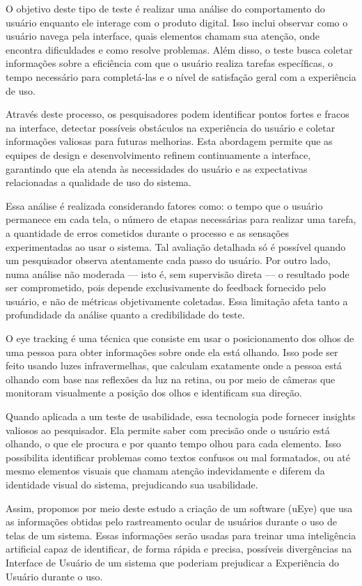 O objetivo deste tipo de teste é realizar uma análise do comportamento do usuário enquanto ele interage com o produto digital. Isso inclui observar como o usuário navega pela interface, quais elementos chamam sua atenção, onde encontra dificuldades e como resolve problemas. Além disso, o teste busca coletar informações sobre a eficiência com que o usuário realiza tarefas específicas, o tempo necessário para completá-las e o nível de satisfação geral com a experiência de uso.

Através deste processo, os pesquisadores podem identificar pontos fortes e fracos na interface, detectar possíveis obstáculos na experiência do usuário e coletar informações valiosas para futuras melhorias. Esta abordagem permite que as equipes de design e desenvolvimento refinem continuamente a interface, garantindo que ela atenda às necessidades do usuário e as expectativas relacionadas a qualidade de uso do sistema.

Essa análise é realizada considerando fatores como: o tempo que o usuário permanece em cada tela, o número de etapas necessárias para realizar uma tarefa, a quantidade de erros cometidos durante o processo e as sensações experimentadas ao usar o sistema. Tal avaliação detalhada só é possível quando um pesquisador observa atentamente cada passo do usuário. Por outro lado, numa análise não moderada — isto é, sem supervisão direta — o resultado pode ser comprometido, pois depende exclusivamente do feedback fornecido pelo usuário, e não de métricas objetivamente coletadas. Essa limitação afeta tanto a profundidade da análise quanto a credibilidade do teste.

\textcite{BELISIARIO2023, VIEIRA2019}


O eye tracking é uma técnica que consiste em usar o posicionamento dos olhos de uma pessoa para obter informações sobre onde ela está olhando. Isso pode ser feito usando luzes infravermelhas, que calculam exatamente onde a pessoa está olhando com base nas reflexões da luz na retina, ou por meio de câmeras que monitoram visualmente a posição dos olhos e identificam sua direção.

Quando aplicada a um teste de usabilidade, essa tecnologia pode fornecer insights valiosos ao pesquisador. Ela permite saber com precisão onde o usuário está olhando, o que ele procura e por quanto tempo olhou para cada elemento. Isso possibilita identificar problemas como textos confusos ou mal formatados, ou até mesmo elementos visuais que chamam atenção indevidamente e diferem da identidade visual do sistema, prejudicando sua usabilidade.

Assim, propomos por meio deste estudo a criação de um software (uEye) que usa as informações obtidas pelo rastreamento ocular de usuários durante o uso de telas de um sistema. Essas informações serão usadas para treinar uma inteligência artificial capaz de identificar, de forma rápida e precisa, possíveis divergências na Interface de Usuário de um sistema que poderiam prejudicar a Experiência do Usuário durante o uso.


